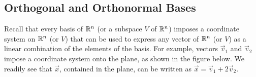 \documentclass{ximera}
\begin{document}
\subsection*{Orthogonal and Orthonormal Bases}
Recall that every basis of $\mathbb{R}^n$ (or a subspace $V$ of $\mathbb{R}^n$) imposes a coordinate system on $\mathbb{R}^n$ (or $V$) that can be used to express any vector of $\mathbb{R}^n$ (or $V$) as a linear combination of the elements of the basis.  For example, vectors $\vec{v}_1$ %
and $\vec{v}_2$ %
impose a coordinate system onto the plane, as shown in the figure below.  We readily see that $\vec{x}$, contained in the plane, %
can be written as $\vec{x}=\vec{v}_1+2\vec{v}_2$.
\end{document}
